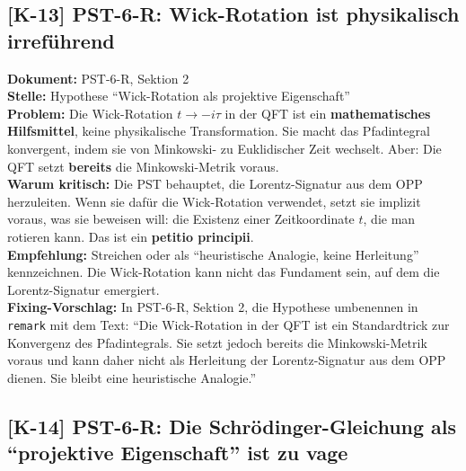 \documentclass[11pt,a4paper]{article}
\newcommand{\K}[1]{\textbf{[K-#1]}}
\newcommand{\Dok}[1]{\textbf{Dokument:} #1\\}
\newcommand{\Stelle}[1]{\textbf{Stelle:} #1\\}
\newcommand{\Prob}[1]{\textbf{Problem:} #1\\}
\newcommand{\Krit}[1]{\textbf{Warum kritisch:} #1\\}
\newcommand{\Empf}[1]{\textbf{Empfehlung:} #1\\}
\newcommand{\Fix}[1]{\textbf{Fixing-Vorschlag:} #1\\}
\begin{document}
\subsection{\K{13} PST-6-R: Wick-Rotation ist physikalisch irref\"{u}hrend}

\Dok{PST-6-R, Sektion 2}
\Stelle{Hypothese ``Wick-Rotation als projektive Eigenschaft''}
\Prob{Die Wick-Rotation $t \to -i\tau$ in der QFT ist ein
\textbf{mathematisches Hilfsmittel}, keine physikalische
Transformation. Sie macht das Pfadintegral konvergent, indem sie
von Minkowski- zu Euklidischer Zeit wechselt. Aber: Die QFT setzt
\textbf{bereits} die Minkowski-Metrik voraus.}
\Krit{Die PST behauptet, die Lorentz-Signatur aus dem OPP
herzuleiten. Wenn sie daf\"{u}r die Wick-Rotation verwendet, setzt sie
implizit voraus, was sie beweisen will: die Existenz einer
Zeitkoordinate $t$, die man rotieren kann. Das ist ein
\textbf{petitio principii}.}
\Empf{Streichen oder als ``heuristische Analogie, keine Herleitung''
kennzeichnen. Die Wick-Rotation kann nicht das Fundament sein, auf dem
die Lorentz-Signatur emergiert.}
\Fix{In PST-6-R, Sektion 2, die Hypothese umbenennen in
\texttt{remark} mit dem Text: ``Die Wick-Rotation in der QFT ist ein
Standardtrick zur Konvergenz des Pfadintegrals. Sie setzt jedoch
bereits die Minkowski-Metrik voraus und kann daher nicht als
Herleitung der Lorentz-Signatur aus dem OPP dienen. Sie bleibt eine
heuristische Analogie.''}

\subsection{\K{14} PST-6-R: Die Schr\"{o}dinger-Gleichung als
``projektive Eigenschaft'' ist zu vage}
\end{document}
